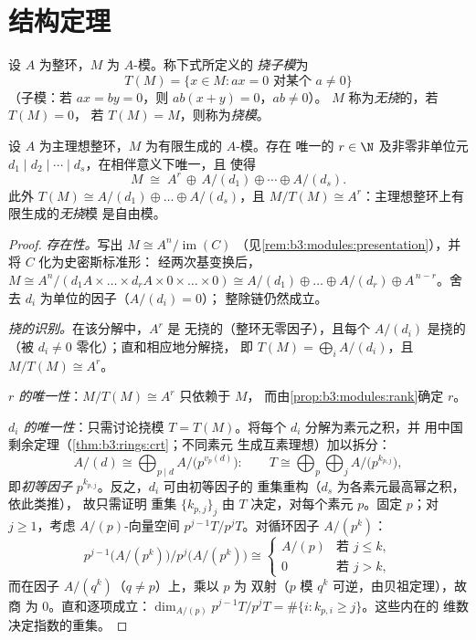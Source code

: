\section{结构定理}

\begin{definition}\label{def:b3:modules:torsion}
设 $A$ 为整环，$M$ 为 $A$-模。称下式所定义的
\emph{挠子模}为
\[
T(M) = \{x \in M : ax = 0 \text{ 对某个 } a \neq 0\}
\]
（子模：若 $ax = by = 0$，则 $ab(x + y) = 0$，$ab \ne 0$）。
$M$ 称为\emph{无挠}的，若 $T(M) = 0$，
若 $T(M) = M$，则称为\emph{挠模}。
\end{definition}

\begin{theorem}[主理想整环上有限生成模的
结构]\label{thm:b3:modules:structure}
设 $A$ 为主理想整环，$M$ 为有限生成的 $A$-模。存在
唯一的 $r \in \N$ 及非零非单位元 $d_1 \mid d_2 \mid
\cdots \mid d_s$，在相伴意义下唯一，且
使得
\[
M \;\cong\; A^r \,\oplus\, A/(d_1) \oplus \cdots \oplus A/(d_s).
\]
此外 $T(M) \cong A/(d_1)\oplus\dots\oplus A/(d_s)$，且 $M/T(M)
\cong A^r$：主理想整环上有限生成的\emph{无挠}模
是自由模。
\end{theorem}

\begin{proof}
\emph{存在性。}写出 $M \cong A^n/\operatorname{im}(C)$
（见\cref{rem:b3:modules:presentation}），并将 $C$ 化为史密斯标准形：
经两次基变换后，$M \cong A^n / (d_1A \times \dots
\times d_rA \times 0 \times \dots \times 0) \cong A/(d_1) \oplus
\dots \oplus A/(d_r) \oplus A^{\,n - r}$。舍去
$d_i$ 为单位的因子（$A/(d_i) = 0$）；
整除链仍然成立。

\emph{挠的识别。}在该分解中，$A^r$ 是
无挠的（整环无零因子），且每个 $A/(d_i)$
是挠的（被 $d_i \ne 0$ 零化）；直和相应地分解挠，
即 $T(M) = \bigoplus_i A/(d_i)$，且 $M/T(M) \cong A^r$。

\emph{$r$ 的唯一性}：$M/T(M) \cong A^r$ 只依赖于 $M$，
而由\cref{prop:b3:modules:rank}确定 $r$。

\emph{$d_i$ 的唯一性}：只需讨论挠模
$T = T(M)$。将每个 $d_i$ 分解为素元之积，并
用中国剩余定理（\cref{thm:b3:rings:crt}；不同素元
生成互素理想）加以拆分：
\[
A/(d) \cong \bigoplus_{p \mid d} A/\bigl(p^{v_p(d)}\bigr):
\qquad
T \cong \bigoplus_{p} \bigoplus_{j} A/\bigl(p^{k_{p,j}}\bigr),
\]
即\emph{初等因子}
$p^{k_{p,j}}$。反之，$d_i$ 可由初等因子的
重集重构（$d_s$ 为各素元最高幂之积，依此类推），
故只需证明
重集 $\{k_{p,j}\}_j$ 由 $T$ 决定，对每个素元
$p$。固定 $p$；对 $j \geq 1$，考虑 $A/(p)$-向量空间
$p^{j-1}T/p^jT$。对循环因子 $A/(p^k)$：
\[
p^{j-1}\bigl(A/(p^k)\bigr)\big/p^{j}\bigl(A/(p^k)\bigr)
\cong
\begin{cases}
A/(p) & \text{若 } j \leq k,\\
0 & \text{若 } j > k,
\end{cases}
\]
而在因子 $A/(q^k)$（$q \neq p$）上，乘以 $p$ 为
双射（$p$ 模 $q^k$ 可逆，由贝祖定理），故商
为 $0$。直和逐项成立：$\dim_{A/(p)}
p^{j-1}T/p^jT = \#\{i : k_{p,i} \geq j\}$。这些内在的
维数决定指数的重集。
\end{proof}

